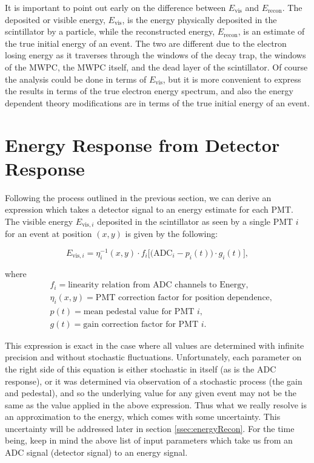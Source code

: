 It is important to point out early on the difference between $E_{\mathrm{vis}}$ and
$E_{\mathrm{recon}}$. The deposited or visible energy, $E_{\mathrm{vis}}$, is the energy
physically deposited in the
scintillator by a particle, while the reconstructed energy, $E_{\mathrm{recon}}$, is an estimate of
the true initial energy of an event. The two are different due to the electron losing energy
as it traverses through the windows of the decay trap, the windows of the MWPC,
the MWPC itself, and the dead layer of the scintillator. Of course the analysis could be
done in terms of $E_{\mathrm{vis}}$, but it is more convenient to express the results
in terms of the true electron energy spectrum, and also the energy dependent theory modifications
are in terms of the true initial energy of an event.


\section{Energy Response from Detector Response} \label{sec:EnergyResponse}
Following the process outlined in the previous section, we can derive an
expression which takes a detector signal to an energy estimate for each PMT.
The visible energy $E_{\mathrm{vis},i}$ deposited
in the scintillator as seen by a single PMT $i$ for an event at position $(x,y)$ 
is given by the following: 

\begin{equation} \label{eq:EvisResponse}
E_{\mathrm{vis},i} = \eta_i^{-1}(x,y) \cdot f_i\Big[ \Big( \mathrm{ADC}_i - p_i(t) \Big) \cdot g_i(t) \Big]  ,
\end{equation}

\noindent where 
\begin{align*}
&f_i = \textrm{linearity relation from ADC channels to Energy,}\\
&\eta_i(x,y) = \textrm{PMT correction factor for position dependence,} \\
&p(t) = \textrm{mean pedestal value for PMT } i,\\
&g(t) = \textrm{gain correction factor for PMT }i.
\end{align*}

This expression is exact in the case where all values are determined with infinite
precision and without stochastic fluctuations. Unfortunately, each parameter on the right
side of this equation is either stochastic in itself (as is the ADC response), or it was
determined via observation of a stochastic process (the gain and pedestal), and so
the underlying value for any given event may not be the same as the value applied in the
above expression. Thus what we
really resolve is an approximation to the energy, which comes with some uncertainty. This
uncertainty will be addressed later in section \ref{ssec:energyRecon}.
For the time being, keep in mind the above list of
input parameters which take us from an ADC signal (detector signal) to an energy signal. 

